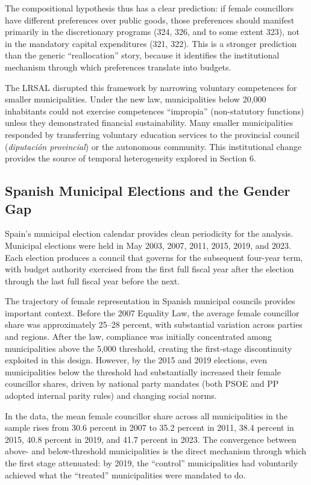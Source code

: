 \documentclass[12pt]{article}
\begin{document}
The compositional hypothesis thus has a clear prediction: if female councillors have different preferences over public goods, those preferences should manifest primarily in the discretionary programs (324, 326, and to some extent 323), not in the mandatory capital expenditures (321, 322). This is a stronger prediction than the generic ``reallocation'' story, because it identifies the institutional mechanism through which preferences translate into budgets.

The LRSAL disrupted this framework by narrowing voluntary competences for smaller municipalities. Under the new law, municipalities below 20,000 inhabitants could not exercise competences ``impropia'' (non-statutory functions) unless they demonstrated financial sustainability. Many smaller municipalities responded by transferring voluntary education services to the provincial council (\emph{diputaci\'{o}n provincial}) or the autonomous community. This institutional change provides the source of temporal heterogeneity explored in Section 6.

\subsection{Spanish Municipal Elections and the Gender Gap}

Spain's municipal election calendar provides clean periodicity for the analysis. Municipal elections were held in May 2003, 2007, 2011, 2015, 2019, and 2023. Each election produces a council that governs for the subsequent four-year term, with budget authority exercised from the first full fiscal year after the election through the last full fiscal year before the next.

The trajectory of female representation in Spanish municipal councils provides important context. Before the 2007 Equality Law, the average female councillor share was approximately 25--28 percent, with substantial variation across parties and regions. After the law, compliance was initially concentrated among municipalities above the 5,000 threshold, creating the first-stage discontinuity exploited in this design. However, by the 2015 and 2019 elections, even municipalities below the threshold had substantially increased their female councillor shares, driven by national party mandates (both PSOE and PP adopted internal parity rules) and changing social norms.

In the data, the mean female councillor share across all municipalities in the sample rises from 30.6 percent in 2007 to 35.2 percent in 2011, 38.4 percent in 2015, 40.8 percent in 2019, and 41.7 percent in 2023. The convergence between above- and below-threshold municipalities is the direct mechanism through which the first stage attenuated: by 2019, the ``control'' municipalities had voluntarily achieved what the ``treated'' municipalities were mandated to do.
\end{document}
